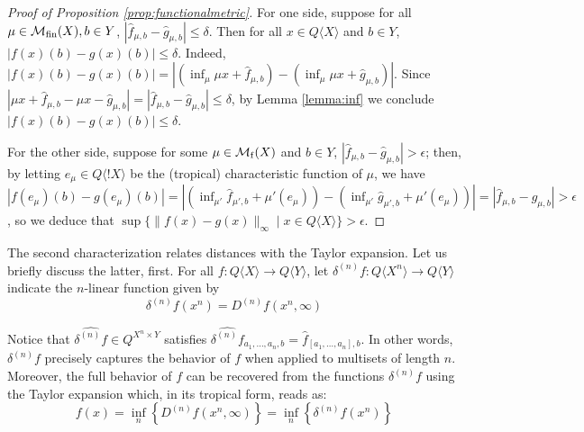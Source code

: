   
  \begin{proof}[Proof of Proposition \ref{prop:functionalmetric}]
For one side, suppose for all $\mu\in \mathcal{M}_{\mathrm{fin}}(X),b\in Y$, 
$|\widehat f_{\mu,b}-\widehat g_{\mu,b}|\leq \delta$. Then for all $ x \in Q\langle X\rangle$ and $b\in Y$, $|f( x )(b)-g( x )(b)|\leq \delta$.
Indeed, $|f( x )(b)-g( x )(b)|= |( \inf_{\mu}\mu  x +\widehat f_{\mu,b})- (\inf_{\mu}\mu  x +\widehat g_{\mu,b})|$. 
Since $|\mu  x +\widehat f_{\mu,b} - \mu  x  -\widehat g_{\mu,b}|= |\widehat f_{\mu,b}-\widehat g_{\mu,b}|\leq \delta$, by Lemma \ref{lemma:inf} we conclude $|f( x )(b)-g( x )(b)|\leq \delta$. 


For the other side, suppose for some $\mu\in \mathcal{M}_{\mathrm f}(X)$ and $b\in Y$, $|\widehat f_{\mu,b}-\widehat g_{\mu,b}|> \epsilon$; 
then, by letting $e_{\mu}\in Q\langle !X\rangle$ be the (tropical) characteristic function of $\mu$, we have
 $|f(e_{\mu})({b})-g(e_{\mu})({b})| =
|( \inf_{\mu'}\widehat f_{\mu',b}+ \mu'(e_{\mu}))-
( \inf_{\mu'}\widehat g_{\mu',b}+\mu'(e_{\mu}))|=
|\widehat f_{\mu,b}- \widehat g_{\mu,b}|> \epsilon$, so we deduce that 
$\sup\{\| f( x )- g( x ) \|_{\infty}\mid  x \in Q\langle X\rangle\}> \epsilon$.
\end{proof}


The second characterization relates distances with the Taylor expansion. Let us briefly discuss the latter, first.
For all $f: Q\langle X\rangle \to Q\langle Y\rangle$, let $\delta^{(n)}f:Q\langle X^{n}\rangle \to Q\langle Y\rangle$ indicate the $n$-linear function given by 
$$
\delta^{(n)}f( x ^{n})= D^{(n)}f( x ^{n}, \infty)
$$

Notice that $\widehat{\delta^{(n)}f}\in Q^{X^{n}\times Y}$ satisfies 
$\widehat{\delta^{(n)}f}_{a_{1},\dots, a_{n},b}= \widehat f_{[a_{1},\dots, a_{n}],b}$.
In other words, $\delta^{(n)}f$ precisely captures the behavior of $f$ when applied to multisets of length $n$. Moreover, the full behavior of $f$ can be recovered from the functions $\delta^{(n)}f$ using the Taylor expansion which, in its tropical form, reads as:
\begin{equation*}
f( x )= \inf_{n}\left \{ D^{(n)}f( x ^{n},\infty)\right\}= \inf_{n}\left \{\delta^{(n)}f( x ^{n})\right\}
\end{equation*}





